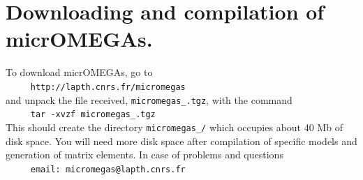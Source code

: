 \documentclass[12pt,a4paper]{article}
\begin{document}
\section{Downloading and compilation of micrOMEGAs.}
To   download  micrOMEGAs, go to    \\  
\verb|     http://lapth.cnrs.fr/micromegas|\\
and unpack the file received, \verb|micromegas_|\VERSION\verb|.tgz|, with the command\\
\verb|     tar -xvzf micromegas_|\VERSION\verb|.tgz|\\
This should create the directory \verb|micromegas_|\VERSION\verb|/| which occupies about 40
Mb of disk space. You will need more disk space after compilation of
specific models and generation of matrix elements.
In case of problems and questions\\
\verb|     email: micromegas@lapth.cnrs.fr|\\
\end{document}
